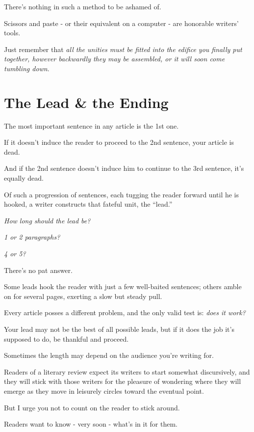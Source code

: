 \documentclass{book}
\numberwithin{equation}{section}
\begin{document}
%
There's nothing in such a method to be ashamed of.

Scissors and paste - or their equivalent on a computer - are honorable writers' tools.

Just remember that \textit{all the unities must be fitted into the edifice you finally put together, however backwardly they may be assembled, or it will soon come tumbling down}.


\chapter{The Lead \& the Ending}

The most important sentence in any article is the 1st one.

If it doesn't induce the reader to proceed to the 2nd sentence, your article is dead.

And if the 2nd sentence doesn't induce him to continue to the 3rd sentence, it's equally dead.

Of such a progression of sentences, each tugging the reader forward until he is hooked, a writer constructs that fateful unit, the ``lead.''

\textit{How long should the lead be?}

\textit{1 or 2 paragraphs?}

\textit{4 or 5?}

There's no pat answer.

Some leads hook the reader with just a few well-baited sentences; others amble on for several pages, exerting a slow but steady pull.

Every article posses a different problem, and the only valid test is: \textit{does it work?}

Your lead may not be the best of all possible leads, but if it does the job it's supposed to do, be thankful and proceed.

%
Sometimes the length may depend on the audience you're writing for.

Readers of a literary review expect its writers to start somewhat discursively, and they will stick with those writers for the pleasure of wondering where they will emerge as they move in leisurely circles toward the eventual point.

But I urge you not to count on the reader to stick around.

Readers want to know - very soon - what's in it for them.
\end{document}
